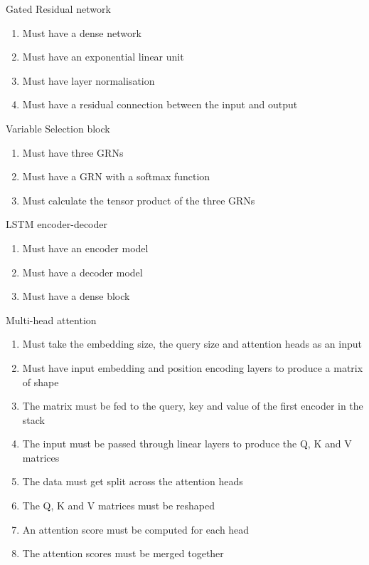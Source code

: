 \documentclass{article}
\begin{document}
Gated Residual network
\begin{enumerate}
    \item Must have a dense network
    \item Must have an exponential linear unit
    \item Must have layer normalisation
    \item Must have a residual connection between the input and output
\end{enumerate}
Variable Selection block
\begin{enumerate}
    \item Must have three GRNs
    \item Must have a GRN with a softmax function
    \item Must calculate the tensor product of the three GRNs
\end{enumerate}
LSTM encoder-decoder
\begin{enumerate}
    \item Must have an encoder model
    \item Must have a decoder model
    \item Must have a dense block
\end{enumerate}
Multi-head attention
\begin{enumerate}
    \item Must take the embedding size, the query size and attention heads as an input
    \item Must have input embedding and position encoding layers to produce a matrix of shape
    \item The matrix must be fed to the query, key and value of the first encoder in the stack
    \item The input must be passed through linear layers to produce the Q, K and V matrices
    \item The data must get split across the attention heads
    \item The Q, K and V matrices must be reshaped
    \item An attention score must be computed for each head
    \item The attention scores must be merged together
\end{enumerate}



\clearpage
\end{document}
